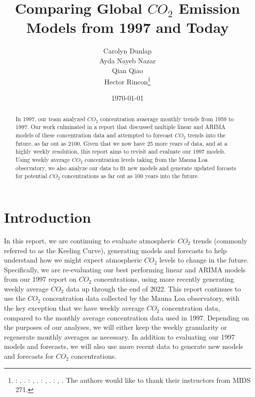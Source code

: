 \documentclass[AER]{AEA}
\begin{document}
\title{Comparing Global \(CO_{2}\) Emission Models from 1997 and Today}


\author{
  Carolyn Dunlap\\
  Ayda Nayeb Nazar\\
  Qian Qiao\\
  Hector Rincon\thanks{
  : , \href{mailto:}{}.
  : , \href{mailto:}{}.
  : , \href{mailto:}{}.
  : , \href{mailto:}{}.
  The authors would like to thank their instructors from MIDS 271.
}
}

\date{\today}
\JEL{}

\begin{abstract}
In 1997, our team analyzed \(CO_{2}\) concentration avaerage monthly
trends from 1959 to 1997. Our work culminated in a report that discussed
multiple linear and ARIMA models of these concentration data and
attempted to forecast \(CO_{2}\) trends into the future, as far out as
2100. Given that we now have 25 more years of data, and at a highly
weekly resolution, this report aims to revisit and evaluate our 1997
models. Using weekly average \(CO_{2}\) concentration levels taking from
the Mauna Loa observatory, we also analyze our data to fit new models
and generate updated forcasts for potential \(CO_{2}\) concentrations as
far out as 100 years into the future.
\end{abstract}


\maketitle

\hypertarget{introduction}{%
\section{Introduction}\label{introduction}}

In this report, we are continuing to evaluate atmospheric \(CO_{2}\)
trends (commonly referred to as the Keeling Curve), generating models
and forecasts to help understand how we might expect atmospheric
\(CO_{2}\) levels to change in the future. Specifically, we are
re-evaluating our best performing linear and ARIMA models from our 1997
report on \(CO_{2}\) concentrations, using more recently generating
weekly average \(CO_{2}\) data up through the end of 2022. This report
continues to use the \(CO_{2}\) concentration data collected by the
Mauna Loa observatory, with the key exception that we have weekly
average \(CO_{2}\) concentration data, compared to the monthly average
concentration data used in 1997. Depending on the purposes of our
analyses, we will either keep the weekly granularity or regenerate
monthly averages as necessary. In addition to evaluating our 1997 models
and forecasts, we will also use more recent data to generate new models
and forecasts for \(CO_{2}\) concentrations.
\end{document}
